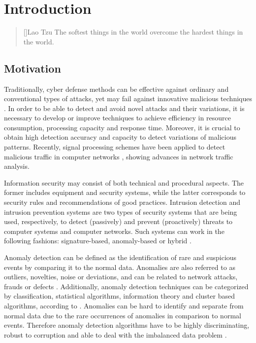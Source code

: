 \chapter{Introduction}
\label{ch:1_introduction}

\begin{quotation}[]{Lao Tzu}
The softest things in the world overcome the hardest things in the world.
\end{quotation}


\section{Motivation}
\label{sc:motivation}

Traditionally, cyber defense methods can be effective against ordinary and conventional types of attacks, yet may fail against innovative malicious techniques \cite{lakhina2005mining}. In order to be able to detect and avoid novel attacks and their variations, it is necessary to develop or improve techniques to achieve efficiency in resource consumption, processing capacity and response time. Moreover, it is crucial to obtain high detection accuracy and capacity to detect variations of malicious patterns. Recently, signal processing schemes have been applied to detect malicious traffic in computer networks \cite{Lu2009,Huang2009,Zonglin2009,david2011blind,da2012improved,tenorio2013greatest, vieira2017model}, showing advances in network traffic analysis.

Information security may consist of both technical and procedural aspects. The former includes equipment and security systems, while the latter corresponds to security rules and recommendations of good practices. Intrusion detection and intrusion prevention systems are two types of security systems that are being used, respectively, to detect (passively) and prevent (proactively) threats to computer systems and computer networks. Such systems can work in the following fashions: signature-based, anomaly-based or hybrid \cite{Huang2009,mudzingwa2012study}.

Anomaly detection can be defined as the identification of rare and suspicious events by comparing it to the normal data. Anomalies are also referred to as outliers, novelties, noise or deviations, and can be related to network attacks, frauds or defects \cite{bhuyan2014network,ahmed2016survey}. Additionally, anomaly detection techniques can be categorized by classification, statistical algorithms, information theory and cluster based algorithms, according to \cite{bhuyan2014network,ahmed2016survey,osanaiye2016distributed}. Anomalies can be hard to identify and separate from normal data due to the rare occurrences of anomalies in comparison to normal events. Therefore anomaly detection algorithms have to be highly discriminating, robust to corruption and able to deal with the imbalanced data problem \cite{he2008learning}.

